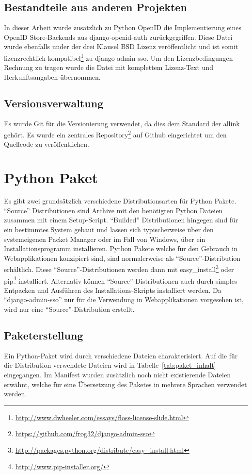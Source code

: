 \subsection{Bestandteile aus anderen Projekten}
\label{sub:bestandteile_aus_anderen_projekten}
In dieser Arbeit wurde zusätzlich zu Python OpenID die Implementierung eines OpenID Store-Backends aus django-openid-auth zurückgegriffen. Diese Datei wurde ebenfalls under der drei Klausel BSD Lizenz veröffentlicht und ist somit lizenzrechtlich kompatibel\footnote{\url{http://www.dwheeler.com/essays/floss-license-slide.html}} zu django-admin-sso. Um den Lizenzbedingungen Rechnung zu tragen wurde die Datei mit komplettem Lizenz-Text und Herkunftsangaben übernommen.

\subsection{Versionsverwaltung}
\label{sub:versionsverwaltung}
Es wurde \gls{Git} für die Versionierung verwendet, da dies dem Standard der allink gehört. Es wurde ein zentrales Repository\footnote{\url{https://github.com/frog32/django-admin-sso}} auf Github eingerichtet um den Quellcode zu veröffentlichen.

\section{Python Paket}
\label{sec:Python Paket}
Es gibt zwei grundsätzlich verschiedene Distributionsarten für Python Pakete. ``Source'' Distributionen sind Archive mit den benötigten Python Dateien zusammen mit einem Setup-Script. ``Builded'' Distributionen hingegen sind für ein bestimmtes System gebaut und lassen sich typischerweise über den systemeigenen Packet Manager oder im Fall von Windows, über ein Installationsprogramm installieren. Python Pakete welche für den Gebrauch in Webapplikationen konzipiert sind, sind normalerweise als ``Source''-Distribution erhältlich. Diese ``Source''-Distributionen werden dann mit easy\_install\footnote{\url{http://packages.python.org/distribute/easy_install.html}} oder pip\footnote{\url{http://www.pip-installer.org/}} installiert. Alternativ können ``Source''-Distributionen auch durch simples Entpacken und Ausführen des Installations-Skripts installiert werden. Da ``django-admin-sso'' nur für die Verwendung in Webapplikationen vorgesehen ist, wird nur eine ``Source''-Distribution erstellt.

\subsection{Paketerstellung}
\label{sub:paketerstellung}
Ein Python-Paket wird durch verschiedene Dateien charakterisiert. Auf die für die Distribution verwendete Dateien wird in Tabelle~\ref{tab:paket_inhalt} eingegangen. Im Manifest wurden zusätzlich noch nicht existierende Dateien erwähnt, welche für eine Übersetzung des Paketes in mehrere Sprachen verwendet werden.

